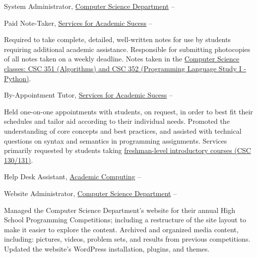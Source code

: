 \documentclass[letterpaper,MMMyyyy,nonstopmode]{simpleresumecv}
\begin{document}
\begin{Body}
\Gap
\BulletItem
System Administrator,
\href{http://cs.rocky.edu}
{Computer Science Department}
\hfill
{} --
\begin{Detail}
\end{Detail}

\Gap
\BulletItem
Paid Note-Taker,
\href{https://www.rocky.edu/student-life/student-support/academic-support/ServicesAcademicSuccess.php}
{Services for Academic Sucess}
\hfill
{} --
\begin{Detail}
\SubBulletItem
Required to take complete, detailed, well-written notes for use by students requiring additional academic assistance.
\SubBulletItem
Responsible for submitting photocopies of all notes taken on a weekly deadline.
\SubBulletItem
Notes taken in the \href{https://www.rocky.edu/academics/catalog/program/9/Computer_Science#courses-content}{Computer Science classes: CSC 351 (Algorithms) and CSC 352 (Programming Language Study I - Python)}.
\end{Detail}

\Gap
\BulletItem
By-Appointment Tutor,
\href{https://www.rocky.edu/student-life/student-support/academic-support/ServicesAcademicSuccess.php}
{Services for Academic Sucess}
\hfill
{} --
\begin{Detail}
\SubBulletItem
Held one-on-one appointments with students, on request, in order to best fit their schedules and tailor aid according to their individual needs.
\SubBulletItem
Promoted the understanding of core concepts and best practices, and assisted with technical questions on syntax and semantics in programming assignments.
\SubBulletItem
Services primarily requested by students taking \href{https://www.rocky.edu/academics/catalog/program/9/Computer_Science#courses-content}{freshman-level introductory courses (CSC 130/131)}.
\end{Detail}

\Gap
\BulletItem
Help Desk Assistant,
\href{https://rocky.edu/student-life/student-support/academic-computing/}
{Academic Computing}
\hfill
{} --
\begin{Detail}
\end{Detail}

\Gap
\BulletItem
Website Administrator,
\href{http://cs.rocky.edu/programming-competitions/high-school-competions/}
{Computer Science Department}
\hfill
{} --
\begin{Detail}
\SubBulletItem
Managed the Computer Science Department's website for their annual High School Programming Competitions;  including a restructure of the site layout to make it easier to explore the content.
\SubBulletItem
Archived and organized media content, including: pictures, videos, problem sets, and results from previous competitions.
\SubBulletItem
Updated the website's WordPress installation, plugins, and themes.
\end{Detail}


\end{Body}
\end{document}
